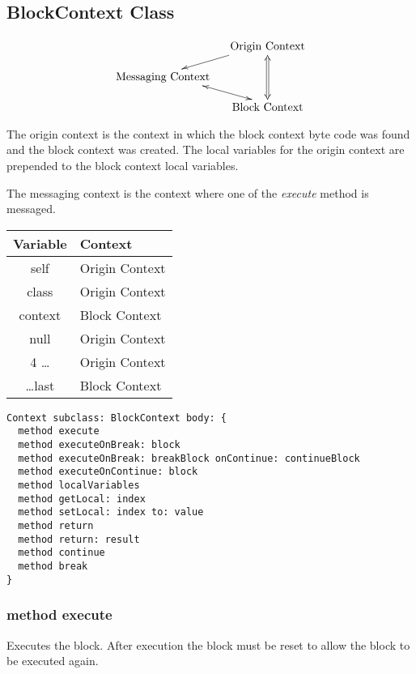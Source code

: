 \subsection {BlockContext Class}

\begin{displaymath}
  \xymatrix @-1pc {
    & \txt{Origin Context} \ar [dl] \ar@{<=>}[dd] \\
    \txt{Messaging Context} \ar@{<->}[dr] & \\
    & \txt{Block Context}\\
  }
\end{displaymath}

The origin context is the context in which the block context byte code was found and the block context was created. The local variables for the origin context are prepended to the block context local variables.

The messaging context is the context where one of the \textit{execute} method is messaged.

\begin{center}
  \begin{tabular}{ c | l }
  	Variable   & Context        \\ \hline
  	self       & Origin Context \\
  	class      & Origin Context \\
  	context    & Block Context  \\
  	null       & Origin Context \\
  	4 \dots    & Origin Context \\
  	\dots last & Block Context
  \end{tabular}
\end{center}


\begin{lstlisting}
Context subclass: BlockContext body: {
  method execute
  method executeOnBreak: block
  method executeOnBreak: breakBlock onContinue: continueBlock
  method executeOnContinue: block
  method localVariables
  method getLocal: index
  method setLocal: index to: value
  method return
  method return: result
  method continue
  method break
}
\end{lstlisting}

\subsubsection{method execute}
Executes the block. After execution the block must be reset to
allow the block to be executed again.

